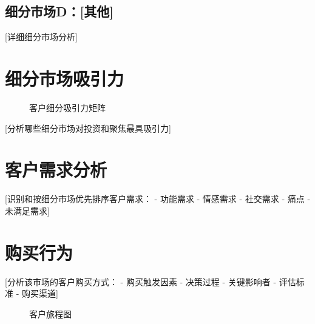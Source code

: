 \documentclass[11pt,letterpaper]{report}
\begin{document}
{\subsection{细分市场D：[其他]}
[详细细分市场分析]

\section{细分市场吸引力}


\begin{figure}[htbp]
\centering
\caption{客户细分吸引力矩阵}
\label{fig:segment_attractiveness}
\end{figure}

[分析哪些细分市场对投资和聚焦最具吸引力]

\section{客户需求分析}

[识别和按细分市场优先排序客户需求：
- 功能需求
- 情感需求
- 社交需求
- 痛点
- 未满足需求]

\section{购买行为}

[分析该市场的客户购买方式：
- 购买触发因素
- 决策过程
- 关键影响者
- 评估标准
- 购买渠道]


\begin{figure}[htbp]
\centering
\caption{客户旅程图}
\label{fig:customer_journey}
\end{figure}

}
\end{document}
